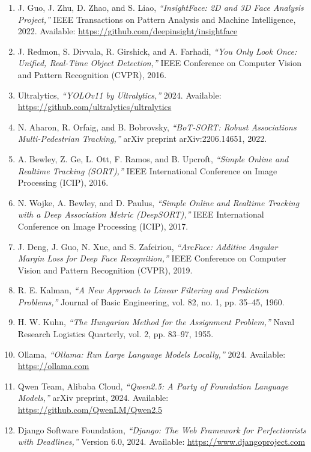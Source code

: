 \documentclass{report}
\begin{document}
\begin{enumerate}

\item J. Guo, J. Zhu, D. Zhao, and S. Liao, \textit{``InsightFace: 2D and 3D Face Analysis Project,''} IEEE Transactions on Pattern Analysis and Machine Intelligence, 2022. Available: \url{https://github.com/deepinsight/insightface}

\item J. Redmon, S. Divvala, R. Girshick, and A. Farhadi, \textit{``You Only Look Once: Unified, Real-Time Object Detection,''} IEEE Conference on Computer Vision and Pattern Recognition (CVPR), 2016.

\item Ultralytics, \textit{``YOLOv11 by Ultralytics,''} 2024. Available: \url{https://github.com/ultralytics/ultralytics}

\item N. Aharon, R. Orfaig, and B. Bobrovsky, \textit{``BoT-SORT: Robust Associations Multi-Pedestrian Tracking,''} arXiv preprint arXiv:2206.14651, 2022.

\item A. Bewley, Z. Ge, L. Ott, F. Ramos, and B. Upcroft, \textit{``Simple Online and Realtime Tracking (SORT),''} IEEE International Conference on Image Processing (ICIP), 2016.

\item N. Wojke, A. Bewley, and D. Paulus, \textit{``Simple Online and Realtime Tracking with a Deep Association Metric (DeepSORT),''} IEEE International Conference on Image Processing (ICIP), 2017.

\item J. Deng, J. Guo, N. Xue, and S. Zafeiriou, \textit{``ArcFace: Additive Angular Margin Loss for Deep Face Recognition,''} IEEE Conference on Computer Vision and Pattern Recognition (CVPR), 2019.

\item R. E. Kalman, \textit{``A New Approach to Linear Filtering and Prediction Problems,''} Journal of Basic Engineering, vol. 82, no. 1, pp. 35--45, 1960.

\item H. W. Kuhn, \textit{``The Hungarian Method for the Assignment Problem,''} Naval Research Logistics Quarterly, vol. 2, pp. 83--97, 1955.

\item Ollama, \textit{``Ollama: Run Large Language Models Locally,''} 2024. Available: \url{https://ollama.com}

\item Qwen Team, Alibaba Cloud, \textit{``Qwen2.5: A Party of Foundation Language Models,''} arXiv preprint, 2024. Available: \url{https://github.com/QwenLM/Qwen2.5}

\item Django Software Foundation, \textit{``Django: The Web Framework for Perfectionists with Deadlines,''} Version 6.0, 2024. Available: \url{https://www.djangoproject.com}

\end{enumerate}
\end{document}

